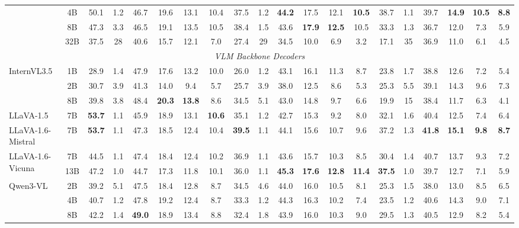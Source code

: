 \begin{table}[h]
{\begin{tabular}{lccccccc|cccccc|cccccc}
 & 4B & 50.1 & 1.2 & 46.7 & 19.6 & 13.1 & 10.4 & 37.5 & 1.2 & \textbf{44.2} & 17.5 & 12.1 & \textbf{10.5} & 38.7 & 1.1 & 39.7 & \textbf{14.9} & \textbf{10.5} & \textbf{8.8} \\
 & 8B & 47.3 & 3.3 & 46.5 & 19.1 & 13.5 & 10.5 & 38.4 & 1.5 & 43.6 & \textbf{17.9} & \textbf{12.5} & 10.5 & 33.3 & 1.3 & 36.7 & 12.0 & 7.3 & 5.9 \\
 & 32B & 37.5 & 28 & 40.6 & 15.7 & 12.1 & 7.0 & 27.4 & 29 & 34.5 & 10.0 & 6.9 & 3.2 & 17.1 & 35 & 36.9 & 11.0 & 6.1 & 4.5 \\
\midrule
\multicolumn{20}{c}{\textit{VLM Backbone Decoders}} \\
\midrule
\multirow{3}{*}{InternVL3.5} & 1B & 28.9 & 1.4 & 47.9 & 17.6 & 13.2 & 10.0 & 26.0 & 1.2 & 43.1 & 16.1 & 11.3 & 8.7 & 23.8 & 1.7 & 38.8 & 12.6 & 7.2 & 5.4 \\
 & 2B & 30.7 & 3.9 & 41.3 & 14.0 & 9.4 & 5.7 & 25.7 & 3.9 & 38.0 & 12.5 & 8.6 & 5.3 & 25.3 & 5.5 & 39.1 & 14.3 & 9.6 & 7.3 \\
 & 8B & 39.8 & 3.8 & 48.4 & \textbf{20.3} & \textbf{13.8} & 8.6 & 34.5 & 5.1 & 43.0 & 14.8 & 9.7 & 6.6 & 19.9 & 15 & 38.4 & 11.7 & 6.3 & 4.1 \\
LLaVA-1.5 & 7B & \textbf{53.7} & 1.1 & 45.9 & 18.9 & 13.1 & \textbf{10.6} & 35.1 & 1.2 & 42.7 & 15.3 & 9.2 & 8.0 & 32.1 & 1.6 & 40.4 & 12.5 & 7.4 & 6.4 \\
LLaVA-1.6-Mistral & 7B & \textbf{53.7} & 1.1 & 47.3 & 18.5 & 12.4 & 10.4 & \textbf{39.5} & 1.1 & 44.1 & 15.6 & 10.7 & 9.6 & 37.2 & 1.3 & \textbf{41.8} & \textbf{15.1} & \textbf{9.8} & \textbf{8.7} \\
\multirow{2}{*}{LLaVA-1.6-Vicuna} & 7B & 44.5 & 1.1 & 47.4 & 18.4 & 12.4 & 10.2 & 36.9 & 1.1 & 43.6 & 15.7 & 10.3 & 8.5 & 30.4 & 1.4 & 40.7 & 13.7 & 9.3 & 7.2 \\
 & 13B & 47.2 & 1.0 & 44.7 & 17.3 & 11.8 & 10.1 & 36.0 & 1.1 & \textbf{45.3} & \textbf{17.6} & \textbf{12.8} & \textbf{11.4} & \textbf{37.5} & 1.0 & 39.7 & 12.7 & 7.1 & 5.9 \\
\multirow{4}{*}{Qwen3-VL} & 2B & 39.2 & 5.1 & 47.5 & 18.4 & 12.8 & 8.7 & 34.5 & 4.6 & 44.0 & 16.0 & 10.5 & 8.1 & 25.3 & 1.5 & 38.0 & 13.0 & 8.5 & 6.5 \\
 & 4B & 40.7 & 1.2 & 47.8 & 19.2 & 12.4 & 8.7 & 33.3 & 1.2 & 44.3 & 16.3 & 10.2 & 7.4 & 23.5 & 1.2 & 40.6 & 14.3 & 9.0 & 7.1 \\
 & 8B & 42.2 & 1.4 & \textbf{49.0} & 18.9 & 13.4 & 8.8 & 32.4 & 1.8 & 43.9 & 16.0 & 10.3 & 9.0 & 29.5 & 1.3 & 40.5 & 12.9 & 8.2 & 5.4 \\

\end{tabular}}
\end{table}
